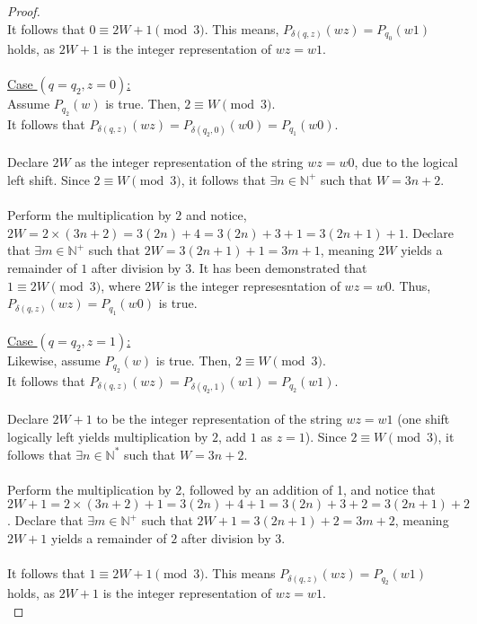 \documentclass[12pt]{article}
\begin{document}
\begin{proof}
    \\
    It follows that $0 \equiv 2W + 1 \pmod{3}$. This means, $P_{\delta(q, z)}(wz) = P_{q_0}(w1)$ holds, as $2W + 1$ is the integer representation of $wz = w1$. \\
    \\
    \underline{Case $(q = q_2, z = 0)$:} \\
    Assume $P_{q_2}(w)$ is true. Then, $2 \equiv W \pmod{3}$. \\
    It follows that $P_{\delta(q, z)}(wz) = P_{\delta(q_2, 0)}(w0) = P_{q_1}(w0)$. \\
    \\
    Declare $2W$ as the integer representation of the string $wz = w0$, due to the logical left shift. Since $2 \equiv W \pmod{3}$, it follows that $\exists n \in \mathbb{N}^+$ such that $W = 3n + 2$. \\
    \\
    Perform the multiplication by $2$ and notice, $2W = 2 \times (3n + 2) = 3(2n) + 4 = 3(2n) + 3 + 1 = 3(2n + 1) + 1$. Declare that $\exists m \in \mathbb{N}^+$ such that $2W = 3(2n + 1) + 1 = 3m + 1$, meaning $2W$ yields a remainder of $1$ after division by 3. It has been demonstrated that $1 \equiv 2W \pmod{3}$, where $2W$ is the integer represesntation of $wz = w0$. Thus, $P_{\delta(q, z)}(wz) = P_{q_1}(w0)$ is true. \\
    \\
    \underline{Case $(q = q_2, z = 1)$:} \\
    Likewise, assume $P_{q_2}(w)$ is true. Then, $2 \equiv W \pmod{3}$. \\
    It follows that $P_{\delta(q, z)}(wz) = P_{\delta(q_2, 1)}(w1) = P_{q_2}(w1)$. \\
    \\
    Declare $2W + 1$ to be the integer representation of the string $wz = w1$ (one shift logically left yields multiplication by $2$, add $1$ as $z = 1$). Since $2 \equiv W \pmod{3}$, it follows that $\exists n \in \mathbb{N}^*$ such that $W = 3n + 2$. \\
    \\
    Perform the multiplication by 2, followed by an addition of 1, and notice that $2W + 1 = 2 \times(3n + 2) + 1 = 3(2n) + 4 + 1 = 3(2n) + 3 + 2 = 3(2n + 1) + 2$. Declare that $\exists m \in \mathbb{N}^+$ such that $2W + 1 = 3(2n + 1) + 2 = 3m + 2$, meaning $2W + 1$ yields a remainder of $2$ after division by $3$. \\
    \\
    It follows that $1 \equiv 2W + 1 \pmod{3}$. This means $P_{\delta(q, z)}(wz) = P_{q_2}(w1)$ holds, as $2W + 1$ is the integer representation of $wz = w1$. \\

\end{proof}
\end{document}

